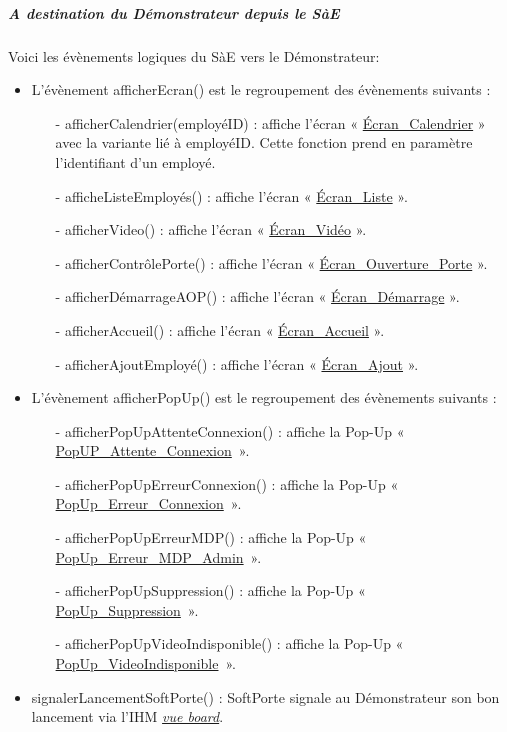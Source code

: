 \newpage

\subparagraph{\textit{A destination du Démonstrateur depuis le SàE}}
Voici les évènements logiques du SàE vers le Démonstrateur:\newline
    \begin{itemize}
    \item L'évènement afficherEcran() est le regroupement des évènements suivants :
        \begin{itemize}
            \item[-] afficherCalendrier(employéID) : affiche l'écran « \hyperlink{EcranCalendrier}{Écran\_Calendrier} » avec la variante lié à employéID. 
            Cette fonction prend en paramètre l'identifiant d'un employé. 
            \item[-] afficheListeEmployés() : affiche l'écran « \hyperlink{EcranListe}{Écran\_Liste} ».
            \item[-] afficherVideo() : affiche l'écran « \hyperlink{EcranVideo}{Écran\_Vidéo} ».
            \item[-] afficherContrôlePorte() : affiche l'écran « \hyperlink{EcranPorte}{Écran\_Ouverture\_Porte} ».
            \item[-] afficherDémarrageAOP() : affiche l'écran « \hyperlink{EcranDemarrage}{Écran\_Démarrage} ».
            \item[-] afficherAccueil() : affiche l'écran « \hyperlink{EcranAccueil}{Écran\_Accueil} ».
            \item[-] afficherAjoutEmployé() : affiche l'écran « \hyperlink{EcranAjoutStandard}{Écran\_Ajout} ».
        \end{itemize}
    \item L'évènement afficherPopUp() est le regroupement des évènements suivants :
        \begin{itemize}
            \item[-] afficherPopUpAttenteConnexion() : affiche la Pop-Up « \hyperlink{popUpAttenteConnexion}{PopUP\_Attente\_Connexion}~».
            \item[-] afficherPopUpErreurConnexion() : affiche la Pop-Up « \hyperlink{popUpErreurConnexion}{PopUp\_Erreur\_Connexion}~».
            \item[-] afficherPopUpErreurMDP() : affiche la Pop-Up « \hyperlink{popUpErreurMDPAdmin}{PopUp\_Erreur\_MDP\_Admin}~».
            \item[-] afficherPopUpSuppression() : affiche la Pop-Up « \hyperlink{popUpSuppression}{PopUp\_Suppression}~».
            \item[-] afficherPopUpVideoIndisponible() : affiche la Pop-Up « \hyperlink{popUpVideoIndisponible}{PopUp\_VideoIndisponible}~».
        \end{itemize}
    \item signalerLancementSoftPorte() : SoftPorte signale au Démonstrateur son bon lancement via l'IHM \hyperlink{EcranSoftPorte}{\textit{vue board}}.  
    \end{itemize}

